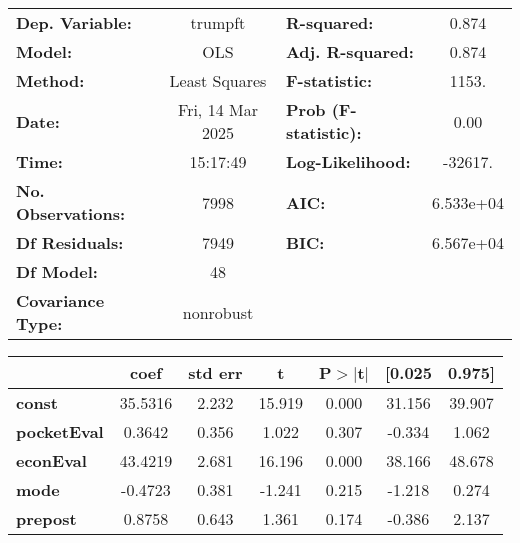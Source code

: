 \begin{center}
\begin{tabular}{lclc}
\toprule
\textbf{Dep. Variable:}         &     trumpft      & \textbf{  R-squared:         } &     0.874   \\
\textbf{Model:}                 &       OLS        & \textbf{  Adj. R-squared:    } &     0.874   \\
\textbf{Method:}                &  Least Squares   & \textbf{  F-statistic:       } &     1153.   \\
\textbf{Date:}                  & Fri, 14 Mar 2025 & \textbf{  Prob (F-statistic):} &     0.00    \\
\textbf{Time:}                  &     15:17:49     & \textbf{  Log-Likelihood:    } &   -32617.   \\
\textbf{No. Observations:}      &        7998      & \textbf{  AIC:               } & 6.533e+04   \\
\textbf{Df Residuals:}          &        7949      & \textbf{  BIC:               } & 6.567e+04   \\
\textbf{Df Model:}              &          48      & \textbf{                     } &             \\
\textbf{Covariance Type:}       &    nonrobust     & \textbf{                     } &             \\
\bottomrule
\end{tabular}
\begin{tabular}{lcccccc}
                                & \textbf{coef} & \textbf{std err} & \textbf{t} & \textbf{P$> |$t$|$} & \textbf{[0.025} & \textbf{0.975]}  \\
\midrule
\textbf{const}                  &      35.5316  &        2.232     &    15.919  &         0.000        &       31.156    &       39.907     \\
\textbf{pocketEval}             &       0.3642  &        0.356     &     1.022  &         0.307        &       -0.334    &        1.062     \\
\textbf{econEval}               &      43.4219  &        2.681     &    16.196  &         0.000        &       38.166    &       48.678     \\
\textbf{mode}                   &      -0.4723  &        0.381     &    -1.241  &         0.215        &       -1.218    &        0.274     \\
\textbf{prepost}                &       0.8758  &        0.643     &     1.361  &         0.174        &       -0.386    &        2.137     \\

\end{tabular}
\end{center}
